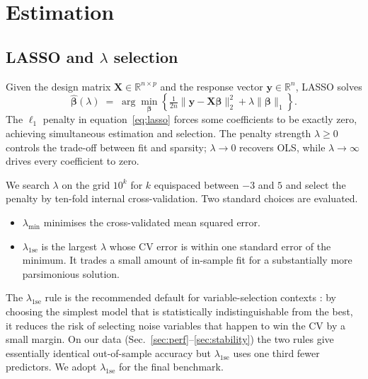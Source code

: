 \documentclass[11pt,a4paper]{article}
\begin{document}
\section{Estimation}
\label{sec:estimation}

\subsection{LASSO and \(\lambda\) selection}

Given the design matrix
\(\mathbf{X} \in \mathbb{R}^{n \times p}\) and the response vector
\(\mathbf{y} \in \mathbb{R}^{n}\), LASSO solves
\begin{equation}
  \hat{\boldsymbol{\beta}}(\lambda) \;=\;
  \arg\min_{\boldsymbol{\beta}}
  \left\{
    \tfrac{1}{2n}
    \lVert \mathbf{y} - \mathbf{X}\boldsymbol{\beta} \rVert_{2}^{2}
    + \lambda \lVert \boldsymbol{\beta} \rVert_{1}
  \right\}.
  \label{eq:lasso}
\end{equation}
The \(\ell_{1}\) penalty in equation~\eqref{eq:lasso} forces some
coefficients to be exactly zero, achieving simultaneous estimation and
selection. The penalty strength \(\lambda \geq 0\) controls the
trade-off between fit and sparsity; \(\lambda \to 0\) recovers OLS,
while \(\lambda \to \infty\) drives every coefficient to zero.

We search \(\lambda\) on the grid \(10^{k}\) for \(k\) equispaced
between \(-3\) and \(5\) and select the penalty by ten-fold internal
cross-validation. Two standard choices are evaluated.
\begin{itemize}[leftmargin=2em]
  \item \(\lambda_{\min}\) minimises the cross-validated mean squared
    error.
  \item \(\lambda_{\mathrm{1se}}\) is the largest \(\lambda\) whose CV
    error is within one standard error of the minimum. It trades a
    small amount of in-sample fit for a substantially more parsimonious
    solution.
\end{itemize}
The \(\lambda_{\mathrm{1se}}\) rule is the recommended default for
variable-selection contexts \citep{hastieTF2009}: by choosing the
simplest model that is statistically indistinguishable from the best,
it reduces the risk of selecting noise variables that happen to win
the CV by a small margin. On our data
(Sec.~\ref{sec:perf}--\ref{sec:stability}) the two rules give
essentially identical out-of-sample accuracy but
\(\lambda_{\mathrm{1se}}\) uses one third fewer predictors. We adopt
\(\lambda_{\mathrm{1se}}\) for the final benchmark.
\end{document}
